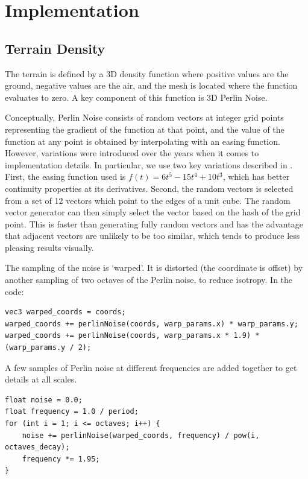 \documentclass {article}
\begin{document}
\section{Implementation}

\subsection{Terrain Density}

The terrain is defined by a 3D density function where positive values are the ground, negative values are the air, and the mesh is located where the function evaluates to zero. A key component of this function is 3D Perlin Noise.

Conceptually, Perlin Noise consists of random vectors at integer grid points representing the gradient of the function at that point, and the value of the function at any point is obtained by interpolating with an easing function. However, variations were introduced over the years when it comes to implementation details. In particular, we use two key variations described in \cite{Fernando:2004:GGP:983868}. First, the easing function used is $f(t) = 6t^5 - 15t^4 + 10t^3$, which has better continuity properties at its derivatives. Second, the random vectors is selected from a set of 12 vectors which point to the edges of a unit cube. The random vector generator can then simply select the vector based on the hash of the grid point. This is faster than generating fully random vectors and has the advantage that adjacent vectors are unlikely to be too similar, which tends to produce less pleasing results visually.

The sampling of the noise is `warped'. It is distorted (the coordinate is offset) by another sampling of two octaves of the Perlin noise, to reduce isotropy. In the code:

\begin{lstlisting}
vec3 warped_coords = coords;
warped_coords += perlinNoise(coords, warp_params.x) * warp_params.y;
warped_coords += perlinNoise(coords, warp_params.x * 1.9) * (warp_params.y / 2);
\end{lstlisting}

A few samples of Perlin noise at different frequencies are added together to get details at all scales.

\begin{lstlisting}
float noise = 0.0;
float frequency = 1.0 / period;
for (int i = 1; i <= octaves; i++) {
    noise += perlinNoise(warped_coords, frequency) / pow(i, octaves_decay);
    frequency *= 1.95;
}
\end{lstlisting}
\end{document}
